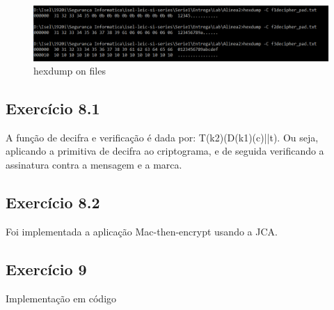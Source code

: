 \documentclass[11pt]{report}
\begin{document}
\begin{figure}[H]
	\centering
	\includegraphics[scale=0.5]{img/padding}
	\caption{hexdump on files}
\end{figure}

\subsection{Exercício 8.1}
A função de decifra e verificação é dada por: T(k2)(D(k1)(c)||t). Ou seja, aplicando a primitiva de decifra ao criptograma, e de seguida verificando a assinatura contra a mensagem e a marca.\\

\subsection{Exercício 8.2}
Foi implementada a aplicação Mac-then-encrypt usando a JCA.\\

\subsection{Exercício 9}
Implementação em código \\
\newpage
\end{document}

